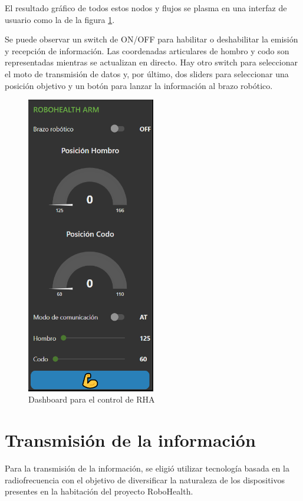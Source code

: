 El resultado gráfico de todos estos nodos y flujos se plasma en una interfaz de usuario como la de la figura \ref{fig:DashRHA}.

Se puede observar un switch de ON/OFF para habilitar o deshabilitar la emisión y recepción de información. Las coordenadas articulares de hombro y codo son representadas mientras se actualizan en directo. Hay otro switch para seleccionar el moto de transmisión de datos y, por último, dos sliders para seleccionar una posición objetivo y un botón para lanzar la información al brazo robótico.

\begin{figure}[H]
\centering
\includegraphics[width=0.5\textwidth]{figuras/DashRHA.png}
\caption{Dashboard para el control de RHA}
\label{fig:DashRHA}
\end{figure}


\section{Transmisión de la información}

Para la transmisión de la información, se eligió utilizar tecnología basada en la radiofrecuencia con el objetivo de diversificar la naturaleza de los dispositivos presentes en la habitación del proyecto RoboHealth.

